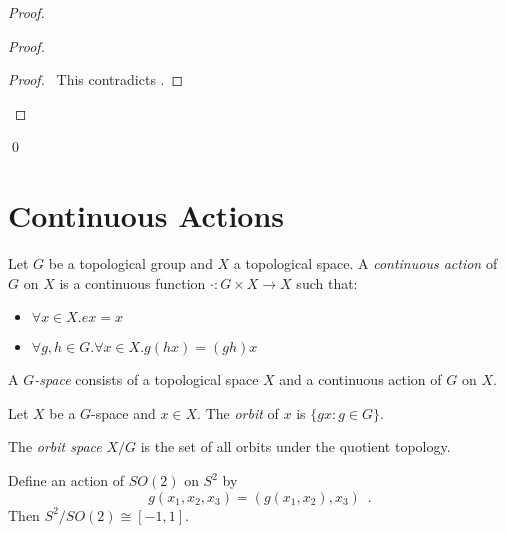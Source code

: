 \begin{proof}
\pf
{}
\begin{proof}
	\qedstep
	\begin{proof}
		\pf\ This contradicts .
	\end{proof}
\end{proof}
\qed
\end{proof}

\section{Continuous Actions}

\begin{df}
Let $G$ be a topological group and $X$ a topological space. A \emph{continuous action} of $G$ on $X$ is a continuous function $\cdot : G \times X \rightarrow X$ such that:
\begin{itemize}
\item $\forall x \in X. ex = x$
\item $\forall g,h \in G. \forall x \in X. g(hx) = (gh)x$
\end{itemize}

A \emph{$G$-space} consists of a topological space $X$ and a continuous action of $G$ on $X$.
\end{df}

\begin{df}[Orbit]
Let $X$ be a $G$-space and $x \in X$. The \emph{orbit} of $x$ is $\{ gx : g \in G \}$.

The \emph{orbit space} $X / G$ is the set of all orbits under the quotient topology.
\end{df}

\begin{prop}
Define an action of $SO(2)$ on $S^2$ by 
\[ g(x_1, x_2, x_3) = (g(x_1, x_2), x_3) \enspace . \] Then $S^2 / SO(2) \cong [-1,1]$.
\end{prop}

